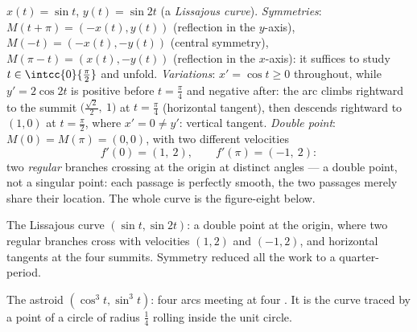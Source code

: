 \begin{example}
\label{ex:b1:curves:lissajous}
$x(t) = \sin t$, $y(t) = \sin 2t$ (a \emph{Lissajous curve}).
\emph{Symmetries}: $M(t + \pi) = (-x(t), y(t))$ (reflection in
the $y$-axis), $M(-t) = (-x(t), -y(t))$ (central symmetry),
$M(\pi - t) = (x(t), -y(t))$ (reflection in the $x$-axis): it
suffices to study $t \in \intcc{0}{\frac\pi2}$ and unfold.
\emph{Variations}: $x' = \cos t \geq 0$ throughout, while $y' =
2\cos 2t$ is positive before $t = \frac\pi4$ and negative after:
the arc climbs rightward to the summit
$\bigl(\frac{\sqrt2}2,\ 1\bigr)$ at $t = \frac\pi4$ (horizontal
tangent), then descends rightward to $(1, 0)$ at $t =
\frac\pi2$, where $x' = 0 \neq y'$: vertical tangent.
\emph{Double point}: $M(0) = M(\pi) = (0,0)$, with two different
velocities
\[
f'(0) = (1,\ 2), \qquad f'(\pi) = (-1,\ 2) :
\]
two \emph{regular} branches crossing at the origin at distinct
angles --- a double point, not a singular point: each passage is
perfectly smooth, the two passages merely share their location.
The whole curve is the figure-eight below.
\end{example}

\begin{omfigure}

{\small The Lissajous curve $(\sin t, \sin 2t)$: a double point
at the origin, where two regular branches cross with velocities
$(1, 2)$ and $(-1, 2)$, and horizontal tangents at the four
summits. Symmetry reduced all the work to a quarter-period.}
\end{omfigure}

\begin{omfigure}

{\small The astroid $(\cos^3 t, \sin^3 t)$: four arcs meeting at
four . It is the curve traced by a point of a circle of radius
$\frac14$ rolling inside the unit circle.}
\end{omfigure}

